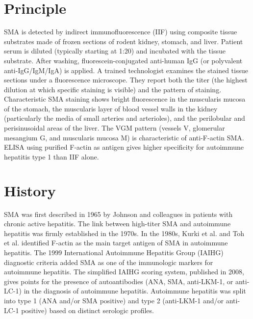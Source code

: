 \section*{Principle}
SMA is detected by indirect immunofluorescence (IIF) using composite tissue substrates made of frozen sections of rodent kidney, stomach, and liver. Patient serum is diluted (typically starting at 1:20) and incubated with the tissue substrate. After washing, fluorescein-conjugated anti-human IgG (or polyvalent anti-IgG/IgM/IgA) is applied. A trained technologist examines the stained tissue sections under a fluorescence microscope. They report both the titer (the highest dilution at which specific staining is visible) and the pattern of staining. Characteristic SMA staining shows bright fluorescence in the muscularis mucosa of the stomach, the muscularis layer of blood vessel walls in the kidney (particularly the media of small arteries and arterioles), and the perilobular and perisinusoidal areas of the liver. The VGM pattern (vessels V, glomerular mesangium G, and muscularis mucosa M) is characteristic of anti-F-actin SMA. ELISA using purified F-actin as antigen gives higher specificity for autoimmune hepatitis type 1 than IIF alone.

\section*{History}
SMA was first described in 1965 by Johnson and colleagues in patients with chronic active hepatitis. The link between high-titer SMA and autoimmune hepatitis was firmly established in the 1970s. In the 1980s, Kurki et al. and Toh et al. identified F-actin as the main target antigen of SMA in autoimmune hepatitis. The 1999 International Autoimmune Hepatitis Group (IAIHG) diagnostic criteria added SMA as one of the immunologic markers for autoimmune hepatitis. The simplified IAIHG scoring system, published in 2008, gives points for the presence of autoantibodies (ANA, SMA, anti-LKM-1, or anti-LC-1) in the diagnosis of autoimmune hepatitis. Autoimmune hepatitis was split into type 1 (ANA and/or SMA positive) and type 2 (anti-LKM-1 and/or anti-LC-1 positive) based on distinct serologic profiles.

